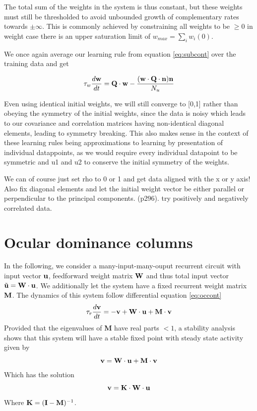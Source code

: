 \documentclass{article}
\begin{document}
The total sum of the weights in the system is thus constant, but these weights must still be thresholded to avoid unbounded growth of complementary rates towards $\pm \infty$. This is commonly achieved by constraining all weights to be $\geq 0$ in weight case there is an upper saturation limit of $w_{max} = \sum_i{w_i(0)}$.

We once again average our learning rule from equation \ref{eq:subcont} over the training data and get

\begin{equation}\label{eq:subavg}
\tau_w \dfrac{d\bf{w}}{dt} = {\bf Q \cdot w} - \dfrac{({\bf w \cdot Q \cdot n}) {\bf n} }{N_u}
\end{equation}

Even using identical initial weights, we will still converge to [0,1] rather than obeying the symmetry of the initial weights, since the data is noisy which leads to our covariance and correlation matrices having non-identical diagonal elements, leading to symmetry breaking. This also makes sense in the context of these learning rules being approximations to learning by presentation of individual datappoints, as we would require every individual datapoint to be symmetric and u1 and u2 to conserve the initial symmetry of the weights.

\Huge{We can of course just set rho to 0 or 1 and get data aligned with the x or y axis!
Also fix diagonal elements and let the initial weight vector be either parallel or perpendicular to the principal components. (p296). try positively and negatively correlated data.}
\normalsize

\section{Ocular dominance columns}

In the following, we consider a many-input-many-ouput recurrent circuit with input vector $\bf u$, feedforward weight matrix $\bf W$ and thus total input vector $\tilde {\bf u} = {\bf W \cdot u}$. We additionally let the system have a fixed recurrent weight matrix $\bf M$. The dynamics of this system follow differential equation \ref{eq:occont}
\begin{equation}\label{eq:occont}
\tau_r \dfrac{d \bf v}{dt} = -{\bf v} + {\bf W \cdot u} + {\bf M\cdot v}
\end{equation}
Provided that the eigenvalues of \textbf{M} have real parts $<1$, a stability analysis shows that this system will have a stable fixed point with steady state activity given by 
\begin{equation}
{\bf v} = {\bf W \cdot u} + {\bf M \cdot v}
\end{equation}
Which has the solution
\begin{equation}
{\bf v} = {\bf K \cdot W \cdot u}
\end{equation}
Where ${\bf K} = ({\bf I} - {\bf M})^{-1}$.
\end{document}
